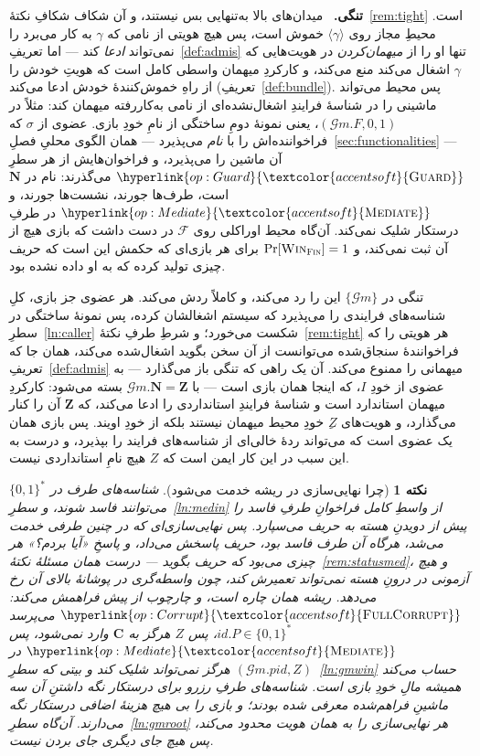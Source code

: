 \documentclass[10pt,oneside,openany]{book}
\newcommand{\PID}{\mathit{pid}}
\newcommand{\admits}{\mathbf{N}}
\newcommand{\Zpid}{\mathbf{Z}}
\newcommand{\Cs}{\mathbf{C}}
\newcommand{\F}{\mathcal{F}}
\newcommand{\op}[1]{\textnormal{\textsc{#1}}}
\newcommand{\opl}[1]{\hyperlink{op:#1}{\textcolor{accentsoft}{\op{#1}}}}
\newcommand{\fopl}[1]{\hyperlink{op:#1}{\textcolor{accentsoft}{\op{Full}\op{#1}}}}
\newcommand{\id}{id}
\newcommand{\Gm}{\mathcal{G}m}
\newcommand{\Win}{\op{Win}}
\newcommand{\bits}{\{0,1\}^*}
\newcommand{\ncl}[1]{\langle #1 \rangle}
\newcommand{\heading}[1]{\medskip\par\noindent\textcolor{accent}{\textbf{#1.}}\ }
\theoremstyle{accentdef}
\newtheorem{remark}[definition]{نکته}
\theoremstyle{accentplain}
\begin{document}
\heading{تنگی} میدان‌های بالا به‌تنهایی بس نیستند، و آن شکاف شکافِ
نکتهٔ~\ref{rem:tight} است. محیطِ مجاز روی $\ncl{\gamma}$ خموش است، پس هیچ
هویتی از نامی که $\gamma$ به کار می‌برد را نمی‌تواند \emph{ادعا} کند ---
اما تعریفِ~\ref{def:admis} تنها او را از \emph{میهمان‌کردن} در هویت‌هایی که
$\gamma$ اشغال می‌کند منع می‌کند، و کارکردِ میهمان واسطی کامل است که هویتِ
خودش را از راهِ خموش‌کنندهٔ خودش ادعا می‌کند
(تعریفِ~\ref{def:bundle}). پس محیط می‌تواند ماشینی را در شناسهٔ فرایندِ
اشغال‌نشده‌ای از نامی به‌کاررفته میهمان کند: مثلاً در $(\Gm.F,0,1)$، یعنی
نمونهٔ دومِ ساختگی از نامِ خودِ بازی. عضوی از $\sigma$ که فراخواننده‌اش را با
\emph{نام} می‌پذیرد --- همان الگوی محلیِ فصلِ~\ref{sec:functionalities} ---
آن ماشین را می‌پذیرد، و فراخوان‌هایش از هر سطرِ $\opl{Guard}$ می‌گذرند: نام
در $\admits$ است، طرف‌ها جورند، نشست‌ها جورند، و $\opl{Mediate}$ در طرفِ
درستکار شلیک نمی‌کند. آن‌گاه محیط اوراکلی روی $\F$ در دست داشت که بازی هیچ
از آن ثبت نمی‌کند، و $\Pr[\Win_{\op{Fin}}] = 1$ برای هر بازی‌ای که حکمش
این است که حریف چیزی تولید کرده که به او داده نشده بود.

تنگی در $\{\Gm\}$ این را رد می‌کند، و کاملاً ردش می‌کند. هر عضوی جز بازی،
کلِ شناسه‌های فرایندی را می‌پذیرد که سیستم اشغالشان کرده، پس نمونهٔ ساختگی
در سطرِ~\ref{ln:caller} شکست می‌خورد؛ و شرطِ طرفِ نکتهٔ~\ref{rem:tight}
هر هویتی را که فراخوانندهٔ سنجاق‌شده می‌توانست از آن سخن بگوید اشغال‌شده
می‌کند، همان جا که تعریفِ~\ref{def:admis} میهمانی را ممنوع می‌کند. آن یک
راهی که تنگی باز می‌گذارد --- به عضوی از خودِ $I$، که اینجا همان بازی است
--- با $\Gm.\admits = \Zpid$ بسته می‌شود: کارکردِ میهمان استاندارد است و
شناسهٔ فرایندِ استانداردی را ادعا می‌کند، که $\Zpid$ آن را کنار می‌گذارد، و
هویت‌های $Z$ِ خودِ محیط میهمان نیستند بلکه از خودِ اویند. پس بازی همان یک
عضوی است که می‌تواند ردهٔ خالی‌ای از شناسه‌های فرایند را بپذیرد، و درست به
این سبب در این کار ایمن است که $Z$ هیچ نامِ استانداردی نیست.

\begin{remark}[چرا نهایی‌سازی در ریشه خدمت می‌شود]\label{rem:finroot}
شناسه‌های طرف در $\bits$ می‌توانند فاسد شوند، و سطرِ~\ref{ln:medin} از
واسطِ کامل فراخوانِ طرفِ فاسد را \emph{پیش از} دویدنِ هسته به حریف می‌سپارد.
پس نهایی‌سازی‌ای که در چنین طرفی خدمت می‌شد، هرگاه آن طرف فاسد بود، حریف
پاسخش می‌داد، و پاسخِ «آیا بردم؟» هر چیزی می‌بود که حریف بگوید --- درست
همان مسئلهٔ نکتهٔ~\ref{rem:statusmed}، و هیچ آزمونی در درونِ هسته نمی‌تواند
تعمیرش کند، چون واسطه‌گری در پوشانهٔ بالای آن رخ می‌دهد. ریشه همان چاره
است، و چارچوب از پیش فراهمش می‌کند: $\fopl{Corrupt}$ می‌پرسد $\id.P \in
\bits$، پس $Z$ هرگز به $\Cs$ وارد نمی‌شود، پس $\opl{Mediate}$ در
$(\Gm.\PID,Z)$ هرگز نمی‌تواند شلیک کند و بیتی که سطرِ~\ref{ln:gmwin} حساب
می‌کند همیشه مالِ خودِ بازی است. شناسه‌های طرفِ رزرو برای درستکار نگه داشتنِ
آن سه ماشینِ فراهم‌شده معرفی شده بودند؛ و بازی را بی هیچ هزینهٔ اضافی
درستکار نگه می‌دارند. آن‌گاه سطرِ~\ref{ln:gmroot} هر نهایی‌سازی را به همان
هویت محدود می‌کند، پس هیچ جای دیگری جای بردن نیست.
\end{remark}
\end{document}
